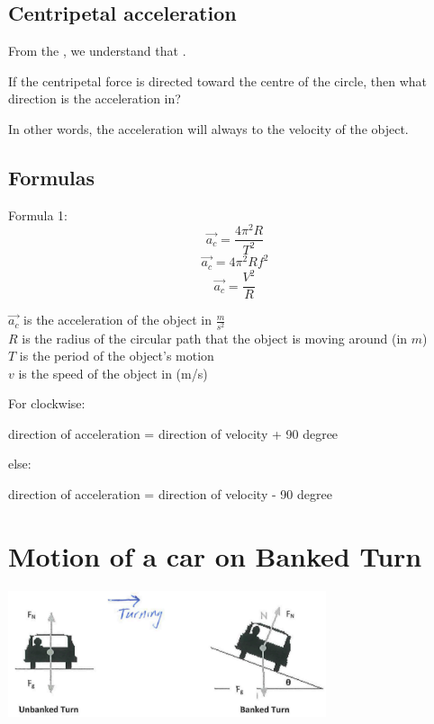 \subsection{Centripetal acceleration}
From the , we understand that .

If the centripetal force is directed toward the centre of the circle, then what direction is the acceleration in?

In other words, the acceleration will always  to the velocity of the object.

\subsection{Formulas}
\begin{cyanblock}
    Formula 1:
    \[
        \vec{a_{c}} = \frac{4 \pi ^2 R}{T^2}
    \]
    \[
        \vec{a_{c}} = 4\pi ^2 R f^2
    \]
    \[
        \vec{a_{c}} = \frac{V^2}{R}
    \]
    \begin{center}
        $\vec{a_{c}}$ is the acceleration of the object in $\frac{m}{s^2}$\\
        $R$ is the radius of the circular path that the object is moving around (in $m$)\\
        $T$ is the period of the object's motion \\
        $v$ is the speed of the object in (m/s)
    \end{center}
\end{cyanblock}

\begin{cyanblock}
    For clockwise:
    \begin{center}
        direction of acceleration = direction of velocity + 90 degree
    \end{center}
    else:
    \begin{center}
         direction of acceleration = direction of velocity - 90 degree
    \end{center}
\end{cyanblock}

\section{Motion of a car on Banked Turn}
\begin{center}
    \includegraphics[width=0.7\textwidth]{graph/BankedTurn.png}
\end{center}
